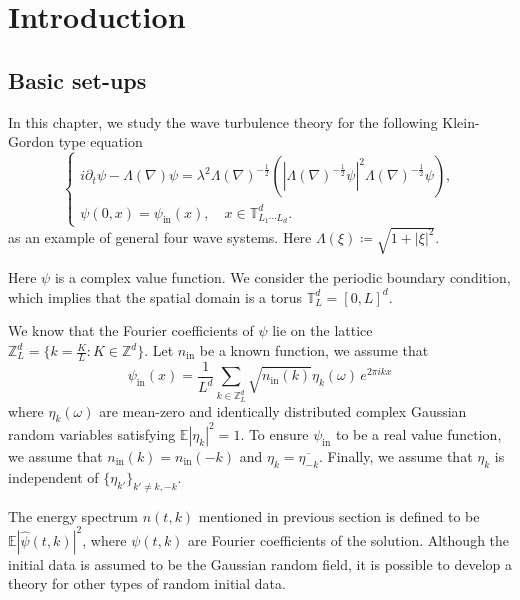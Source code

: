 \section{Introduction}


\subsection{Basic set-ups}

In this chapter, we study the wave turbulence theory for the following Klein-Gordon type equation
\begin{equation}\tag{NKLG}\label{eq.NKLG}
    \begin{cases}
    i\partial_t\psi-\Lambda(\nabla)\psi=\lambda^2 \Lambda(\nabla)^{-\frac{1}{2}}\left(|\Lambda(\nabla)^{-\frac{1}{2}}\psi|^2\Lambda(\nabla)^{-\frac{1}{2}}\psi\right),\\[.6em]
    \psi(0,x) = \psi_{\textrm{in}}(x), \quad x\in \mathbb{T}^d_{L_1\cdots L_d}.
    \end{cases}    
\end{equation}
as an example of general four wave systems. Here $\Lambda(\xi)\coloneqq\sqrt{1+|\xi|^2}$.

Here $\psi$ is a complex value function. We consider the periodic boundary condition, which implies that the spatial domain is a torus $\mathbb{T}^d_{L}=[0,L]^d$. 

We know that the Fourier coefficients of $\psi$ lie on the lattice $\mathbb{Z}_L^d = \{k=\frac{K}{L}:K\in \mathbb{Z}^d\}$. Let $n_{\textrm{in}}$ be a known function, we assume that
\begin{equation}\label{eq.wellprepared}
\psi_{\textrm{in}}(x)=\frac{1}{L^d}\sum_{k\in\mathbb{Z}^d_L}\sqrt{n_{\textrm{in}}(k)} \eta_k(\omega)\,  e^{2\pi i kx}
\end{equation}
where $\eta_k(\omega)$ are mean-zero and identically distributed complex Gaussian random variables satisfying $\mathbb E |\eta_k|^2=1$. To ensure $\psi_{\textrm{in}}$ to be a real value function, we assume that $n_{\textrm{in}}(k)=n_{\textrm{in}}(-k)$ and $\eta_k=\overline{\eta_{-k}}$. Finally, we assume that $\eta_k$ is independent of $\{\eta_{k'}\}_{k'\ne k,-k}$.

The energy spectrum $n(t,k)$ mentioned in previous section is defined to be $\mathbb E |\widehat \psi(t, k)|^2$, where $\psi(t, k)$ are Fourier coefficients of the solution. Although the initial data is assumed to be the Gaussian random field, it is possible to develop a theory for other types of random initial data.

